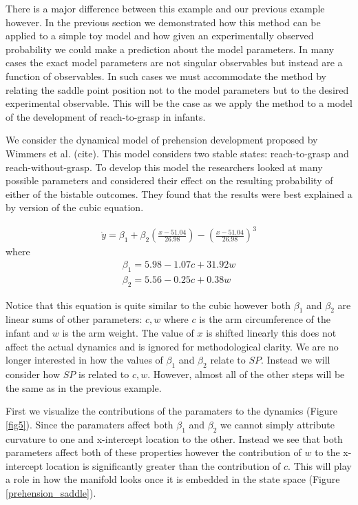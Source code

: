 \documentclass[letterpaper]{article}
\begin{document}
There is a major difference between this example and our previous example however. 
In the previous  section we demonstrated how this method can be applied to a simple
toy model and how given an experimentally observed probability we could make a prediction
about the model parameters. In many cases the exact model parameters are 
not singular observables but instead are a function of observables. In such cases we 
must accommodate the method by relating the saddle point position not to the model
parameters but to the desired experimental observable. 
This will be the case as we apply the method to a model of the development of 
reach-to-grasp in infants. 

We consider the dynamical model of prehension development proposed by 
Wimmers et al. (cite). This
model considers two stable states: reach-to-grasp and reach-without-grasp. 
To develop this
model the researchers looked at many possible parameters and considered 
their effect on 
the resulting probability of either of the bistable outcomes. 
They found that the results
were best explained a by version of the cubic equation.

\begin{eqnarray}
  \dot{y} = \beta_1 + \beta_2 (\frac{x-51.04}{26.98}) - (\frac{x-51.04}{26.98})^3
\end{eqnarray}
where
\begin{eqnarray}
  \beta_1 = 5.98 - 1.07c + 31.92w\\
  \beta_2 = 5.56 - 0.25c + 0.38w
\end{eqnarray}

Notice that this equation is quite similar to the cubic however both $\beta_1$ and 
$\beta_2$ are linear sums of other parameters: $c,w$ 
where $c$ is the arm circumference
of the infant and $w$ is the arm weight. 
The value of $x$ is shifted linearly this does 
not affect the actual dynamics and is ignored for methodological clarity. 
We are no longer
interested in how the values of $\beta_1$ and $\beta_2$ relate to $SP$. 
Instead we will
consider how $SP$ is related to $c,w$. 
However, almost all of the other steps will be the
same as in the previous example.

First we visualize the contributions of the paramaters to the dynamics 
(Figure \ref{fig5}).
Since the paramaters affect both $\beta_1$ and $\beta_2$ we cannot simply attribute 
curvature to one and x-intercept location to the other. 
Instead we see that both parameters
affect both of these properties however the contribution of 
$w$ to the x-intercept location
is significantly greater than the contribution of $c$. 
This will play a role in how the
manifold looks once it is embedded in the state space 
(Figure \ref{prehension_saddle}).
\end{document}
